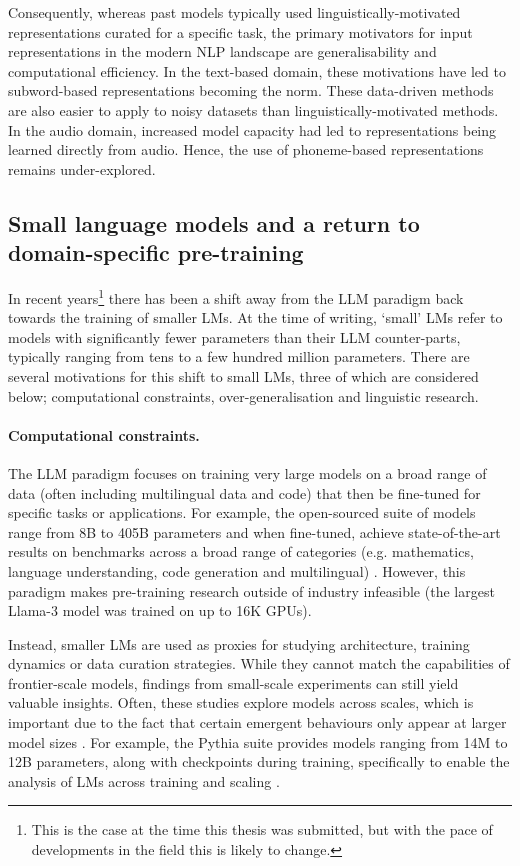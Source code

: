Consequently, whereas past models typically used linguistically-motivated representations curated for a specific task, the primary motivators for input representations in the modern NLP landscape are generalisability and computational efficiency. In the text-based domain, these motivations have led to subword-based representations becoming the norm. These data-driven methods are also easier to apply to noisy datasets than linguistically-motivated methods. In the audio domain, increased model capacity had led to representations being learned directly from audio. Hence, the use of phoneme-based representations remains under-explored. 

\subsection{Small language models and a return to domain-specific pre-training}

In recent years\footnote{This is the case at the time this thesis was submitted, but with the pace of developments in the field this is likely to change.} there has been a shift away from the LLM paradigm back towards the training of smaller LMs. At the time of writing, `small' LMs  refer to models with significantly fewer parameters than their LLM counter-parts, typically ranging from tens to a few hundred million parameters. There are several motivations for this shift to small LMs, three of which are considered below; computational constraints, over-generalisation and linguistic research.

\paragraph{Computational constraints.} The LLM paradigm focuses on training very large models on a broad range of data (often including multilingual data and code) that then be fine-tuned for specific tasks or applications. For example, the open-sourced  suite of models range from 8B to 405B parameters and when fine-tuned, achieve state-of-the-art results on benchmarks across a broad range of categories (e.g. mathematics, language understanding, code generation and multilingual) \citep{grattafiori2024llama}. However, this paradigm makes pre-training research outside of industry infeasible (the largest Llama-3 model was trained on up to 16K GPUs).

Instead, smaller LMs are used as proxies for studying architecture, training dynamics or data curation strategies. While they cannot match the capabilities of frontier-scale models, findings from small-scale experiments can still yield valuable insights. Often, these studies explore models across scales, which is important due to the fact that certain emergent behaviours only appear at larger model sizes \citep{wei2022emergent, ganguli2022predictability}. For example, the Pythia suite provides models ranging from 14M to 12B parameters, along with checkpoints during training, specifically to enable the analysis of LMs across training and scaling \citep{biderman2023pythia}.

